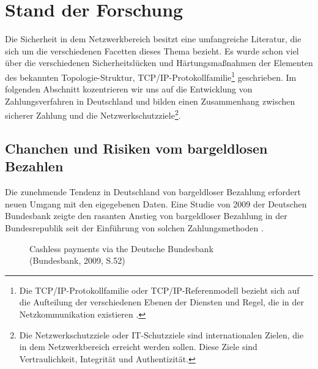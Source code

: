 \section{Stand der Forschung}

Die Sicherheit in dem Netzwerkbereich besitzt eine umfangreiche Literatur, die sich um die verschiedenen
Facetten dieses Thema bezieht. Es wurde schon viel über die verschiedenen Sicherheitslücken und 
Härtungsmaßnahmen der Elementen des bekannten Topologie-Struktur, TCP/IP-Protokollfamilie\footnote{Die
TCP/IP-Protokollfamilie oder TCP/IP-Referenmodell bezieht sich auf die Aufteilung der verschiedenen 
Ebenen der Diensten und Regel, die in der Netzkommunikation existieren \cite{refbook:SWIS}.} geschrieben.
Im folgenden Abschnitt kozentrieren wir uns auf die Entwicklung von Zahlungsverfahren in Deutschland
und bilden einen Zusammenhang zwischen sicherer Zahlung und die Netzwerkschutzziele\footnote{Die 
Netzwerkschutzziele oder IT-Schutzziele sind internationalen Zielen, die in dem Netzwerkbereich
erreicht werden sollen. Diese Ziele sind Vertraulichkeit, Integrität und Authentizität.}.


\subsection{Chanchen und Risiken vom bargeldlosen Bezahlen}

Die zunehmende Tendenz in Deutschland von bargeldloser Bezahlung erfordert neuen Umgang mit den 
eigegebenen Daten. Eine Studie von 2009 der Deutschen Bundesbank zeigte den rasanten Anstieg von 
bargeldloser Bezahlung in der Bundesrepublik seit der Einführung von solchen Zahlungsmethoden 
\cite{refrep:DBCP}.

\begin{figure}[htb]
    \caption{Cashless payments via the Deutsche Bundesbank\\ (Bundesbank, 2009, S.52)}
    \label{fig:refrep_DB}
\end{figure}


